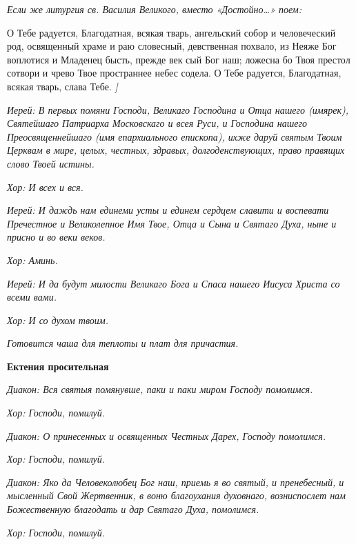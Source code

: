  \itshape Если же литургия св. Василия Великого, вместо «Достойно…»
поем:\normalfont{}


   О Тебе радуется, Благодатная, всякая тварь, ангельский собор и
человеческий род, освященный храме и раю словесный, девственная похвало,
из Неяже Бог воплотися и Младенец бысть, прежде век сый Бог наш;
ложесна бо Твоя престол сотвори и чрево Твое пространнее небес
содела. О Тебе радуется, Благодатная, всякая тварь, слава Тебе.
\itshape ]\normalfont{}


 \itshape Иерей:\normalfont{} В первых помяни Господи, Великаго Господина и Отца
нашего \itshape (имярек),\normalfont{} Святейшаго Патриарха Московскаго и всея Руси, и
Господина нашего Преосвященнейшаго \itshape (имя епархиального епископа)\normalfont{},
ихже даруй святым Твоим Церквам в мире, целых, честных, здравых,
долгоденствующих, право правящих слово Твоей истины.


 \itshape Хор:\normalfont{} И всех и вся.


 \itshape Иерей:\normalfont{} И даждь нам единеми усты и единем сердцем славити и воспевати
Пречестное и Великолепное Имя Твое, Отца и Сына и Святаго Духа, ныне и
присно и во веки веков.


 \itshape Хор:\normalfont{} Аминь.


 \itshape Иерей:\normalfont{} И да будут милости Великаго Бога и Спаса нашего Иисуса Христа
со всеми вами.


 \itshape Хор:\normalfont{} И со духом твоим.


 \itshape Готовится чаша для теплоты и плат для причастия\normalfont{}.



 

\bfseries  Ектения просительная\normalfont{}


 \itshape Диакон:\normalfont{} Вся святыя помянувше, паки и паки миром Господу помолимся.


 \itshape Хор:\normalfont{} Господи, помилуй.


 \itshape Диакон:\normalfont{} О принесенных и освященных Честных Дарех, Господу
помолимся.


 \itshape Хор:\normalfont{} Господи, помилуй.


 \itshape Диакон:\normalfont{} Яко да Человеколюбец Бог наш, приемь я во святый, и
пренебесный, и мысленный Свой Жертвенник, в воню благоухания
духовнаго, возниспослет нам Божественную благодать и дар Святаго Духа,
помолимся.


 \itshape Хор:\normalfont{} Господи, помилуй.


